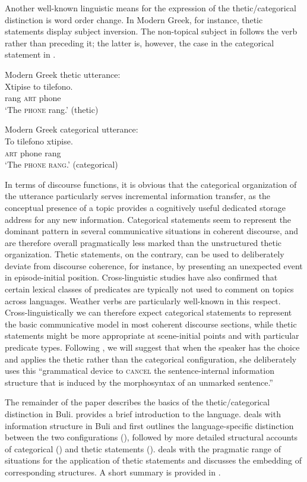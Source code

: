 \documentclass[output=paper]{langsci/langscibook}
\begin{document}
Another well-known linguistic means for the expression of the thetic/categorical distinction is word order change. In Modern Greek, for instance, thetic statements display subject inversion. The non-topical subject in  follows the verb rather than preceding it; the latter is, however, the case in the categorical statement in .

\ea
{ Modern Greek   thetic utterance:}\\
\gll Xtipise    to    tilefono. \\
     rang    \textsc{art}    phone\\
\glt ‘The \textsc{phone} rang.’ (thetic)
\z

\ea
{ Modern Greek   categorical utterance:}\\
\gll To     tilefono   xtipise.\\
     \textsc{art}    phone     rang\\
\glt ‘The \textsc{phone rang}.’ (categorical) \citep[536]{Sasse1987}
\z

In terms of discourse functions, it is obvious that the categorical organization of the utterance particularly serves incremental information transfer, as the conceptual presence of a topic provides a cognitively useful dedicated storage address for any new information. Categorical statements seem to represent the dominant pattern in several communicative situations in coherent discourse, and are therefore overall pragmatically less marked than the unstructured thetic organization. Thetic statements, on the contrary, can be used to deliberately deviate from discourse coherence, for instance, by presenting an unexpected event in episode-initial position. Cross-linguistic studies \citep{Sasse1995} have also confirmed that certain lexical classes of predicates are typically not used to comment on topics across languages. Weather verbs are particularly well-known in this respect. Cross-linguistically we can therefore expect categorical statements to represent the basic communicative model in most coherent discourse sections, while thetic statements might be more appropriate at scene-initial points and with particular predicate types. Following \citet[86]{Güldemann2010}, we will suggest that when the speaker has the choice and applies the thetic rather than the categorical configuration, she deliberately uses this “grammatical device to \textsc{cancel} the sentence-internal information structure that is induced by the morphosyntax of an unmarked sentence.”

The remainder of the paper describes the basics of the thetic/categorical distinction in Buli.  provides a brief introduction to the language.  deals with information structure in Buli and first outlines the language-specific distinction between the two configurations (), followed by more detailed structural accounts of categorical () and thetic statements ().  deals with the pragmatic range of situations for the application of thetic statements and  discusses the embedding of corresponding structures. A short summary is provided in .
\end{document}
